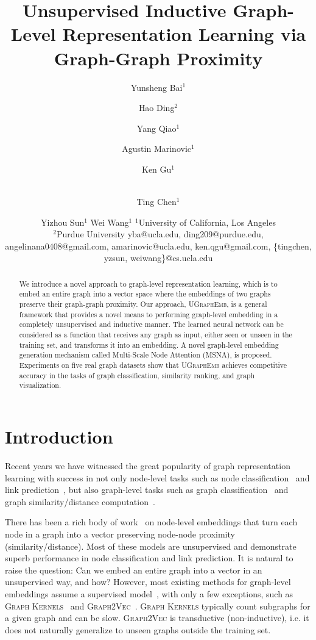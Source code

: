 \documentclass{article}
\title{Unsupervised Inductive Graph-Level Representation Learning via \\ Graph-Graph Proximity}
\author{
Yunsheng Bai$^1$
\and
Hao Ding$^2$\and
Yang Qiao$^1$\and
Agustin Marinovic$^1$\and
Ken Gu$^1$\and \\
Ting Chen$^1$\and
Yizhou Sun$^{1}$\And
Wei Wang$^1$
\affiliations
$^1$University of California, Los Angeles\\
$^2$Purdue University
\emails
yba@ucla.edu,
ding209@purdue.edu,
angelinana0408@gmail.com,
amarinovic@ucla.edu,
ken.qgu@gmail.com,
\{tingchen, yzsun, weiwang\}@cs.ucla.edu
}
\newcommand{\model}{\textsc{UGraphEmb}\xspace}
\newcommand{\gk}{\textsc{Graph Kernels}\xspace}
\newcommand{\gv}{\textsc{Graph2Vec}\xspace}
\begin{document}
\maketitle

\begin{abstract}

We introduce a novel approach to graph-level representation learning, which is to embed an entire graph into a vector space where the embeddings of two graphs preserve their graph-graph proximity. Our approach, \model, is a general framework that provides a novel means to performing graph-level embedding in a completely unsupervised and inductive manner. The learned neural network can be considered as a function that receives any graph as input, either seen or unseen in the training set, and transforms it into an embedding. A novel graph-level embedding generation mechanism called Multi-Scale Node Attention (MSNA), is proposed. Experiments on five real graph datasets show that \model achieves competitive accuracy in the tasks of graph classification, similarity ranking, and graph visualization.




\end{abstract}
 \section{Introduction}
\label{sec-intro}


Recent years we have witnessed the great popularity of graph representation learning with success in not only node-level tasks such as node classification~\cite{kipf2016semi} and link prediction~\cite{zhang2018link}, but also graph-level tasks such as graph classification~\cite{ying2018hierarchical} and graph similarity/distance computation~\cite{bai2018graph}. 


There has been a rich body of work~\cite{belkin2003laplacian,tang2015line,qiu2017network} 
on node-level embeddings that turn each node in a graph into a vector preserving node-node proximity (similarity/distance). Most of these models are unsupervised and demonstrate superb performance in node classification and link prediction. It is natural to raise the question: Can we embed an entire graph into a vector in an unsupervised way, and how?
However, most existing methods for graph-level embeddings assume a supervised model~\cite{ying2018hierarchical,zhang2018capsule}, with only a few exceptions, such as \gk~\cite{yanardag2015deep} and \gv~\cite{narayanan2017graph2vec}. \gk typically count subgraphs for a given graph and can be slow. \gv is transductive (non-inductive), i.e. it does not naturally generalize to unseen graphs outside the training set. 
\end{document}
